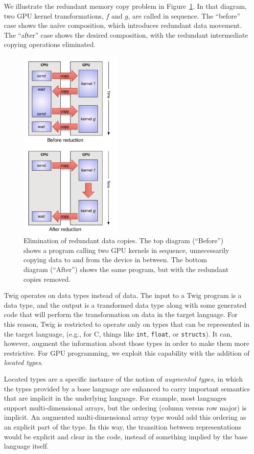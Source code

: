 We illustrate the redundant memory copy problem in Figure~\ref{basic-idea}. In that diagram, two GPU kernel transformations, $f$ and $g$, are called in sequence. The ``before'' case shows the na\"ive composition, which introduces redundant data movement. The ``after'' case shows the desired composition, with the redundant intermediate copying operations eliminated.

\begin{figure}[ht]
\centering
\includegraphics[width=2in]{images/basic-idea}
\caption{Elimination of redundant data copies. The top diagram (``Before'') shows a program calling two GPU kernels in sequence, unnecessarily copying data to and from the device in between. The bottom diagram (``After'') shows the same program, but with the redundant copies removed.}
\label{basic-idea}
\end{figure}

Twig operates on data types instead of data. The input to a Twig program is a data type, and the output is a transformed data type along with some generated code that will perform the transformation on data in the target language. For this reason, Twig is restricted to operate only on types that can be represented in the target language, (e.g., for C, things like \texttt{int}, \texttt{float}, or \texttt{structs}). It can, however, augment the information about those types in order to make them more restrictive. For GPU programming, we exploit this capability with the addition of \emph{located types}.

Located types are a specific instance of the notion of \emph{augmented types}, in which the types provided by a base language are enhanced to carry important semantics that are implicit in the underlying language. For example, most languages support multi-dimensional arrays, but the ordering (column versus row major) is implicit. An augmented multi-dimensional array type would add this ordering as an explicit part of the type. In this way, the transition between representations would be explicit and clear in the code, instead of something implied by the base language itself.

